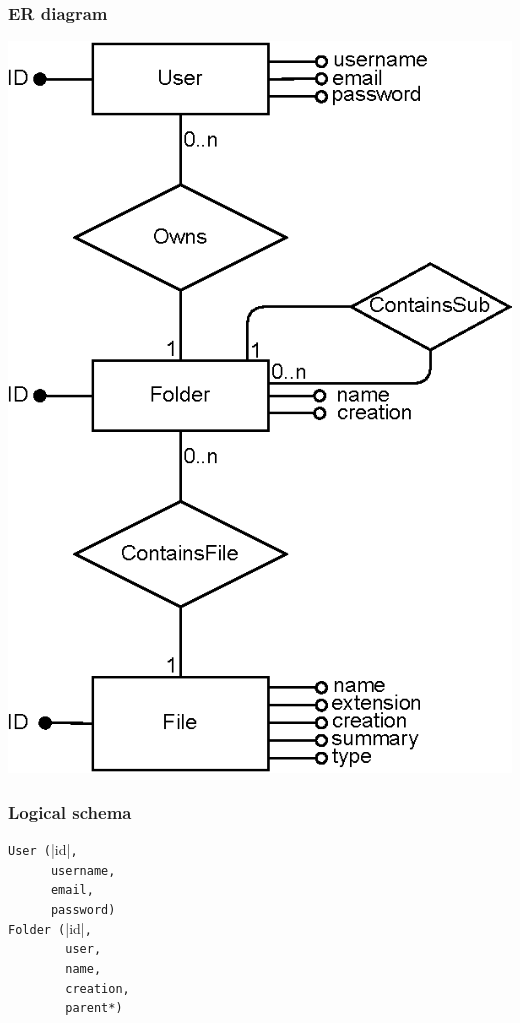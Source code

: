 \documentclass[a4paper, dvipsnames]{article}
\begin{document}
	\begin{multicols}{2}
		
		\subsubsection{ER diagram}
		
		\begin{center}
			\includegraphics[width=0.7\columnwidth]{er}
		\end{center}
		
		\subsubsection{Logical schema}
		
		\verb|User (|\ulverb|id|\verb|,         |  \\
		\verb|      username,   |  \\
		\verb|      email,      |  \\
		\verb|      password)   |  \\
		
		\verb|Folder (|\ulverb|id|\verb|,       |  \\
		\verb|        user,     |  \\
		\verb|        name,     |  \\
		\verb|        creation, |  \\
		\verb|        parent*)  |  \\
		

\end{multicols}
\end{document}
